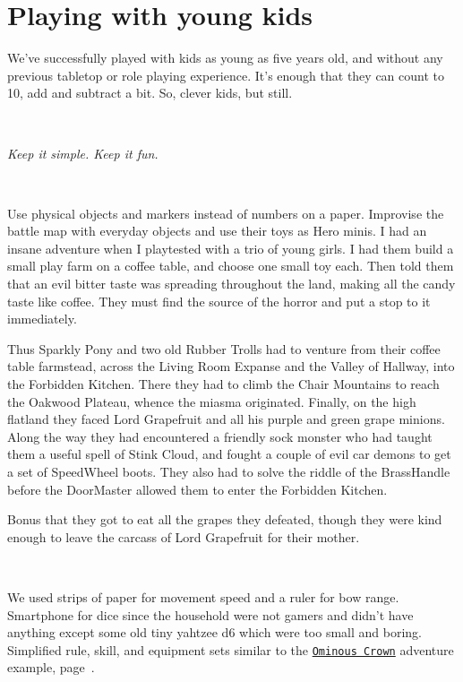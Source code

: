 \section*{Playing with young kids}
We've successfully played with kids as young as five years old, and without any previous tabletop or role playing experience. It's enough that they can count to 10, add and subtract a bit. So, clever kids, but still.

\

\noindent \emph{Keep it simple. Keep it fun.}

\

Use physical objects and markers instead of numbers on a paper. Improvise the battle map with everyday objects and use their toys as Hero minis. I had an insane adventure when I playtested with a trio of young girls. I had them build a small play farm on a coffee table, and choose one small toy each. Then told them that an evil bitter taste was spreading throughout the land, making all the candy taste like coffee. They must find the source of the horror and put a stop to it immediately.

Thus Sparkly Pony and two old Rubber Trolls had to venture from their coffee table farmstead, across the Living Room Expanse and the Valley of Hallway, into the Forbidden Kitchen. There they had to climb the Chair Mountains to reach the Oakwood Plateau, whence the miasma originated. Finally, on the high flatland they faced Lord Grapefruit and all his purple and green grape minions. Along the way they had encountered a friendly sock monster who had taught them a useful spell of Stink Cloud, and fought a couple of evil car demons to get a set of SpeedWheel boots. They also had to solve the riddle of the BrassHandle before the DoorMaster allowed them to enter the Forbidden Kitchen.

Bonus that they got to eat all the grapes they defeated, though they were kind enough to leave the carcass of Lord Grapefruit for their mother.

\

We used strips of paper for movement speed and a ruler for bow range. Smartphone for dice since the household were not gamers and didn't have anything except some old tiny yahtzee d6 which were too small and boring.
Simplified rule, skill, and equipment sets similar to the \hyperref[sec:basicenough]{\texttt{Ominous Crown}} adventure example, page~\pageref{sec:basicenough}.

